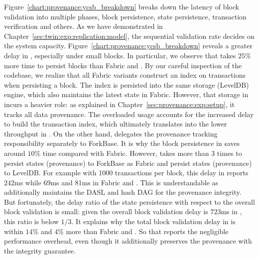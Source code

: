 Figure~\ref{chart:provenance:ycsb_breakdown} breaks down the latency of block validation into multiple phases, block persistence, state persistence, transaction verification and others. 
As we have demonstrated in Chapter~\ref{sec:twin:exp:replication:model}, the sequential validation rate decides on the system capacity. 
Figure~\ref{chart:provenance:ycsb_breakdown} reveals a greater delay in {\fsPrO}, especially under small blocks. 
In particular, we observe that {\fsPrO} takes $25$\% more time to persist blocks than Fabric and {\fsO}.
By our careful inspection of the codebase, we realize that all Fabric variants construct an index on transactions when persisting a block. 
The index is persisted into the same storage (LevelDB) engine, which also maintains the latest state in Fabric.
However, that storage in {\fsPrO} incurs a heavier role: as explained in Chapter~\ref{sec:provenance:exp:setup}, it tracks all data provenance. 
The overloaded usage accounts for the increased delay to build the transaction index, which ultimately translates into the lower throughput in {\fsPrO}. 
On the other hand,  {\fsO} delegates the provenance tracking responsibility separately to ForkBase. 
It is why the block persistence in {\fsO} saves around $10$\% time compared with Fabric. 
However, {\fsO} takes more than 3 times to persist states (provenance) to ForkBase as Fabric and {\fsPrO} persist states (provenance) to LevelDB. 
For example with 1000 transactions per block, this delay in {\fsO} reports $242$ms while 69ms and 81ms in Fabric and {\fsPrO}.
This is understandable as {\fsO} additionally maintains the DASL and hash DAG for the provenance integrity. 
But fortunately, the delay ratio of the state persistence with respect to the overall block validation is small:
given the overall block validation delay is $723$ms in {\fsO}, this ratio is below $1/3$.
It explains why the total block validation delay in {\fsO} is within $14$\% and $4$\% more than Fabric and {\fsO}. 
So that {\fsO} reports the negligible performance overhead, even though it additionally preserves the provenance with the integrity guarantee.


